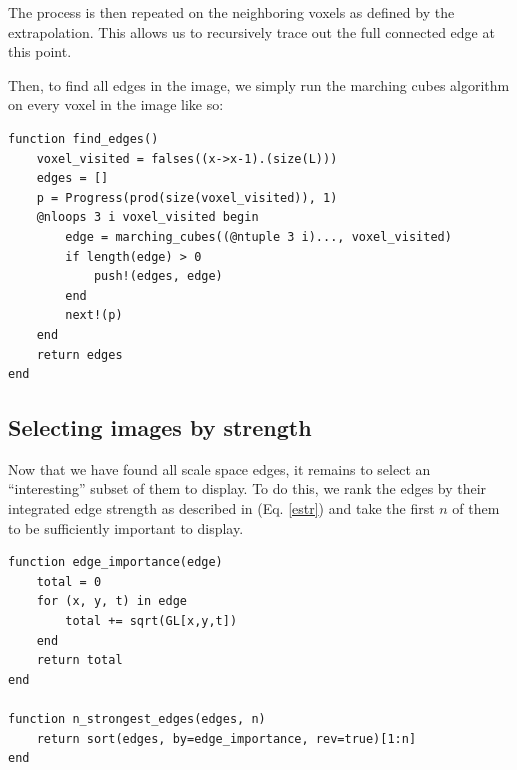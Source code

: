 \documentclass{article}
\begin{document}
The process is then repeated on the neighboring voxels as defined by the extrapolation.
This allows us to recursively trace out the full connected edge at this point.





Then, to find all edges in the image, we simply run the marching cubes algorithm on every voxel in the image like so:
\begin{lstlisting}
function find_edges()
    voxel_visited = falses((x->x-1).(size(L)))
    edges = []
    p = Progress(prod(size(voxel_visited)), 1)
    @nloops 3 i voxel_visited begin
        edge = marching_cubes((@ntuple 3 i)..., voxel_visited)
        if length(edge) > 0
            push!(edges, edge)
        end
        next!(p)
    end
    return edges
end
\end{lstlisting}

\subsection{Selecting images by strength}

Now that we have found all scale space edges, it remains to select an ``interesting'' subset of them to display.
To do this, we rank the edges by their integrated edge strength as described in (Eq. \ref{estr}) and take the first $n$ of them to be sufficiently important to display.
\begin{lstlisting}
function edge_importance(edge)
    total = 0
    for (x, y, t) in edge
        total += sqrt(GL[x,y,t])
    end
    return total
end

function n_strongest_edges(edges, n)
    return sort(edges, by=edge_importance, rev=true)[1:n]
end
\end{lstlisting}
\end{document}
